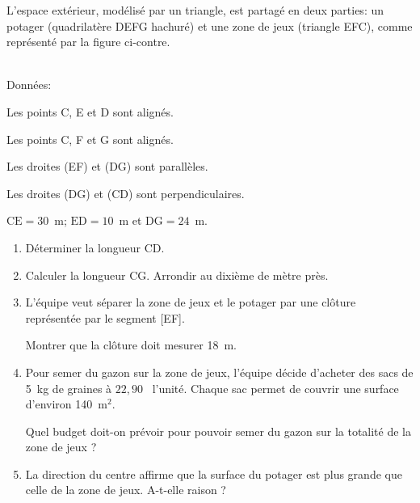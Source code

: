 \documentclass[11pt]{article}
\newcommand{\euro}{\eurologo{}}
\begin{document}
\begin{minipage}{0.5\linewidth}
L'espace extérieur, modélisé par un triangle, est partagé en deux parties: un potager (quadrilatère DEFG hachuré) et une zone de jeux (triangle EFC), comme représenté par la figure ci-contre.\\\\
\begin{list}{\textbullet}{Données:}
\item Les points C, E et D  sont alignés.
\item Les points C, F et G  sont alignés.
\item Les droites (EF) et (DG) sont parallèles.
\item Les droites (DG) et (CD) sont perpendiculaires.
\item $\text{CE}=30$~m; $\text{ED}=10$~m et $\text{DG}=24$~m.
\end{list}
\end{minipage}
\begin{minipage}{0.4\linewidth}
\end{minipage}

\begin{enumerate}
\item Déterminer la longueur CD.
\item Calculer la longueur CG. Arrondir au dixième de mètre près.
\item L'équipe veut séparer la zone de jeux et le potager par une clôture représentée par le segment [EF].

Montrer que la clôture doit mesurer 18~m.
\item Pour semer du gazon sur la zone de jeux, l'équipe décide d'acheter des sacs de 5~kg de graines à $22,90$~\euro{} l'unité. Chaque sac permet de couvrir une surface d'environ 140~m$^2$.

Quel budget doit-on prévoir pour pouvoir semer du gazon sur la totalité de la zone de jeux ?
\item La direction du centre affirme que la surface du potager est plus grande que celle de la zone de jeux. A-t-elle raison ?
\end{enumerate}
\end{document}
